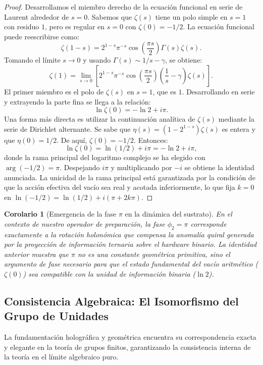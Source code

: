 \documentclass[12pt,a4paper]{article}
\theoremstyle{plain}
\newtheorem{corolario}[teorema]{Corolario}
\theoremstyle{definition}
\theoremstyle{remark}
\begin{document}
\begin{proof}
Desarrollamos el miembro derecho de la ecuación funcional en serie de Laurent alrededor de $s=0$. Sabemos que $\zeta(s)$ tiene un polo simple en $s=1$ con residuo $1$, pero es regular en $s=0$ con $\zeta(0) = -1/2$. La ecuación funcional puede reescribirse como:
\[
\zeta(1-s) = 2^{1-s} \pi^{-s} \cos\left(\frac{\pi s}{2}\right) \Gamma(s) \zeta(s).
\]
Tomando el límite $s \to 0$ y usando $\Gamma(s) \sim 1/s - \gamma$, se obtiene:
\[
\zeta(1) = \lim_{s\to 0} \left[ 2^{1-s} \pi^{-s} \cos\left(\frac{\pi s}{2}\right) \left(\frac{1}{s} - \gamma\right) \zeta(s) \right].
\]
El primer miembro es el polo de $\zeta(s)$ en $s=1$, que es $1$. Desarrollando en serie y extrayendo la parte fina se llega a la relación:
\[
\ln \zeta(0) = -\ln 2 + i\pi.
\]
Una forma más directa es utilizar la continuación analítica de $\zeta(s)$ mediante la serie de Dirichlet alternante. Se sabe que $\eta(s) = (1-2^{1-s})\zeta(s)$ es entera y que $\eta(0) = 1/2$. De aquí, $\zeta(0) = -1/2$. Entonces:
\[
\ln \zeta(0) = \ln(1/2) + i\pi = -\ln 2 + i\pi,
\]
donde la rama principal del logaritmo complejo se ha elegido con $\arg(-1/2)=\pi$. Despejando $i\pi$ y multiplicando por $-i$ se obtiene la identidad anunciada. La unicidad de la rama principal está garantizada por la condición de que la acción efectiva del vacío sea real y acotada inferiormente, lo que fija $k=0$ en $\ln(-1/2)= \ln(1/2)+i(\pi+2k\pi)$.
\end{proof}

\begin{corolario}[Emergencia de la fase $\pi$ en la dinámica del sustrato]
En el contexto de nuestro operador de preparación, la fase $\phi_2 = \pi$ corresponde exactamente a la rotación holonómica que compensa la anomalía quiral generada por la proyección de información ternaria sobre el hardware binario. La identidad anterior muestra que $\pi$ no es una constante geométrica primitiva, sino el argumento de fase necesario para que el estado fundamental del vacío aritmético ($\zeta(0)$) sea compatible con la unidad de información binaria ($\ln 2$).
\end{corolario}

\subsection{Consistencia Algebraica: El Isomorfismo del Grupo de Unidades}
\label{subsec:isomorfismo_unidades}

La fundamentación holográfica y geométrica encuentra su correspondencia exacta y elegante en la teoría de grupos finitos, garantizando la consistencia interna de la teoría en el límite algebraico puro.
\end{document}
